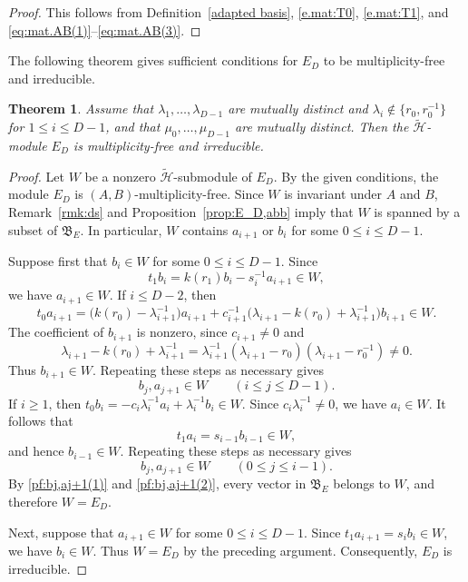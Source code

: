 \documentclass[reqno]{amsart}
\newtheorem{theorem}{Theorem}[section]
\theoremstyle{definition}
\begin{document}
\begin{proof}
%
This follows from Definition~\ref{adapted basis},
\eqref{e.mat:T0}, \eqref{e.mat:T1}, and
\eqref{eq:mat.AB(1)}--\eqref{eq:mat.AB(3)}.
%
\end{proof}


The following theorem gives sufficient conditions for $E_D$ to be
multiplicity-free and irreducible.


\begin{theorem}\label{even irreducible}
%
Assume that $\lambda_1,\dots,\lambda_{D-1}$ are mutually distinct and
$\lambda_i\notin\{r_0,r_0^{-1}\}$ for $1\leq i\leq D-1$, and that
$\mu_0,\dots,\mu_{D-1}$ are mutually distinct.
Then the $\widetilde{\mathcal{H}}$-module $E_D$ is multiplicity-free and irreducible.
%
\end{theorem}

\begin{proof}
%
Let $W$ be a nonzero $\widetilde{\mathcal{H}}$-submodule of $E_D$.
By the given conditions, the module $E_D$ is
$(A,B)$-multiplicity-free.
Since $W$ is invariant under $A$ and $B$,
Remark~\ref{rmk:ds} and
Proposition~\ref{prop:E_D,abb} imply that $W$ is spanned by a subset of
$\mathfrak{B}_E$.
In particular, $W$ contains $a_{i+1}$ or $b_i$ for some
$0\leq i\leq D-1$.

Suppose first that $b_i\in W$ for some $0\leq i\leq D-1$.
Since
$$
t_1b_i=k(r_1)b_i-s_i^{-1}a_{i+1}\in W,
$$
we have $a_{i+1}\in W$.
If $i\leq D-2$, then
$$
t_0a_{i+1}
=
\bigl(k(r_0)-\lambda_{i+1}^{-1}\bigr)a_{i+1}
+
c_{i+1}^{-1}
\bigl(\lambda_{i+1}-k(r_0)+\lambda_{i+1}^{-1}\bigr)b_{i+1}
\in W.
$$
The coefficient of $b_{i+1}$ is nonzero, since $c_{i+1}\neq0$ and
$$
\lambda_{i+1}-k(r_0)+\lambda_{i+1}^{-1}
=
\lambda_{i+1}^{-1}
(\lambda_{i+1}-r_0)(\lambda_{i+1}-r_0^{-1})
\neq0.
$$
Thus $b_{i+1}\in W$.
Repeating these steps as necessary gives
\begin{equation}\label{pf:bj,aj+1(1)}
b_j,a_{j+1}\in W
\qquad (i\leq j\leq D-1).
\end{equation}
If $i\geq1$, then
$t_0b_i = -c_i\lambda_i^{-1}a_i+\lambda_i^{-1}b_i \in W$.
Since $c_i\lambda_i^{-1}\neq0$, we have $a_i\in W$.
It follows that
$$
t_1a_i=s_{i-1}b_{i-1}\in W,
$$
and hence $b_{i-1}\in W$.
Repeating these steps as necessary gives
\begin{equation}\label{pf:bj,aj+1(2)}
b_j,a_{j+1}\in W
\qquad (0\leq j\leq i-1).
\end{equation}
By \eqref{pf:bj,aj+1(1)} and \eqref{pf:bj,aj+1(2)}, every vector in $\mathfrak{B}_E$ belongs to $W$, and therefore
$W=E_D$.

Next, suppose that $a_{i+1}\in W$ for some $0\leq i\leq D-1$.
Since $t_1a_{i+1}=s_ib_i\in W$, we have $b_i\in W$.
Thus $W=E_D$ by the preceding argument.
Consequently, $E_D$ is irreducible.
%
\end{proof}
\end{document}
